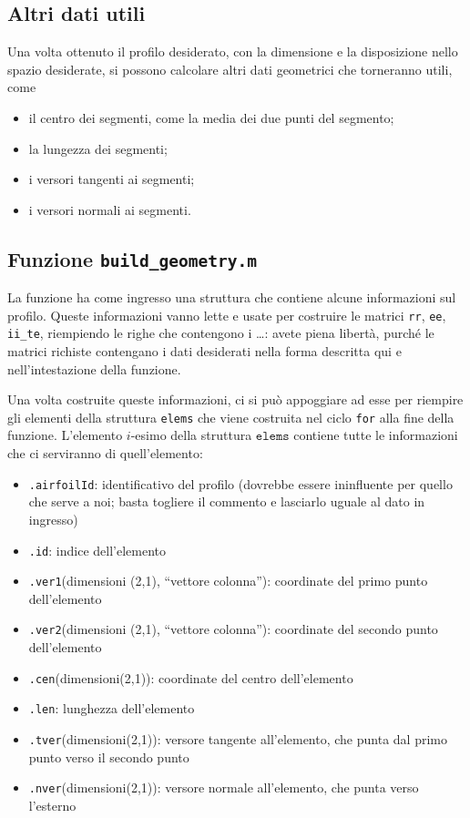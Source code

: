 \documentclass[11pt,fleqn]{article}
\begin{document}
\subsection{Altri dati utili}
Una volta ottenuto il profilo desiderato, con la dimensione e la disposizione nello spazio desiderate, si possono calcolare altri dati geometrici che torneranno utili, come
\begin{itemize}
  \item il centro dei segmenti, come la media dei due punti del segmento;
  \item la lungezza dei segmenti;
  \item i versori tangenti ai segmenti;
  \item i versori normali ai segmenti.
\end{itemize}

\subsection{Funzione \texttt{build\_geometry.m}}
La funzione ha come ingresso una struttura che contiene alcune informazioni sul profilo. Queste informazioni vanno lette e usate per costruire le matrici \texttt{rr}, \texttt{ee}, \texttt{ii\_te}, riempiendo le righe che contengono i \dots: avete piena libertà, purché le matrici richiste contengano i dati desiderati nella forma descritta qui e nell'intestazione della funzione.

Una volta costruite queste informazioni, ci si può appoggiare ad esse per riempire gli elementi della struttura \texttt{elems} che viene costruita nel ciclo \texttt{for} alla fine della funzione. L'elemento $i$-esimo della struttura $\texttt{elems}$ contiene tutte le informazioni che ci serviranno di quell'elemento:
\begin{itemize}
 \item \texttt{.airfoilId}: identificativo del profilo (dovrebbe essere ininfluente per quello che serve a noi; basta togliere il commento e lasciarlo uguale al dato in ingresso)
 \item \texttt{.id}: indice dell'elemento
 \item \texttt{.ver1}(dimensioni (2,1), ``vettore colonna''): coordinate del primo punto dell'elemento 
 \item \texttt{.ver2}(dimensioni (2,1), ``vettore colonna''): coordinate del secondo punto dell'elemento
 \item \texttt{.cen}(dimensioni(2,1)): coordinate del centro dell'elemento
 \item \texttt{.len}: lunghezza dell'elemento
 \item \texttt{.tver}(dimensioni(2,1)): versore tangente all'elemento, che punta dal primo punto verso il secondo punto
 \item \texttt{.nver}(dimensioni(2,1)): versore normale all'elemento, che punta verso l'esterno
\end{itemize}
\end{document}
